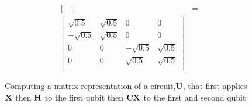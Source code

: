 \begin{figure}[H]
\begin{align*}
\begin{bmatrix}
        \end{bmatrix}
        &=\\
        \begin{bmatrix}
            \sqrt{0.5}  &  \sqrt{0.5} & 0 & 0 \\
            -\sqrt{0.5} &  \sqrt{0.5} & 0 & 0 \\
            0 & 0 & -\sqrt{0.5} & \sqrt{0.5} \\
            0 & 0 & \sqrt{0.5}  & \sqrt{0.5} \\
        \end{bmatrix}& 
    \end{align*}
    \caption{Computing a matrix representation of a circuit,$\mathbf{U}$, that first applies $\mathbf{X}$ then $\mathbf{H}$ to the first qubit then $\mathbf{CX}$ to the first and second qubit}
    \label{fig:circuit_matrix}
\end{figure}
